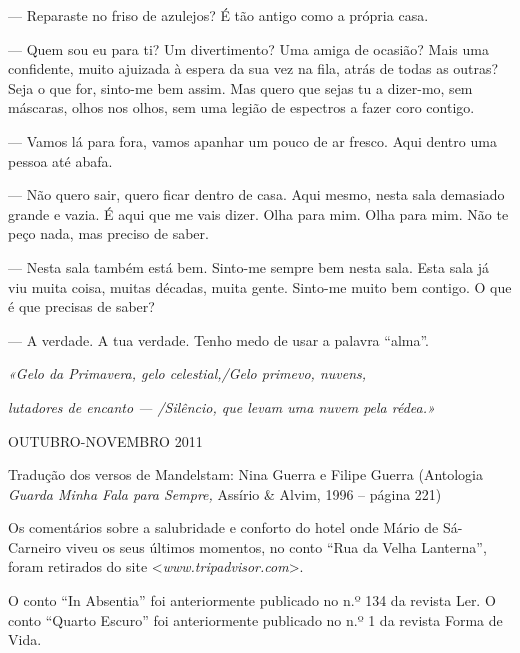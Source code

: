 --- Reparaste no friso de azulejos? É tão antigo como a própria casa.

--- Quem sou eu para ti? Um divertimento? Uma amiga de ocasião? Mais uma
  confidente, muito ajuizada à espera da sua vez na fila, atrás de todas
  as outras? Seja o que for, sinto-me bem assim. Mas quero que sejas tu
  a dizer-mo, sem máscaras, olhos nos olhos, sem uma legião de espectros
  a fazer coro contigo.

--- Vamos lá para fora, vamos apanhar um pouco de ar
fresco. Aqui dentro uma pessoa até abafa.

--- Não quero sair, quero ficar dentro de casa. Aqui mesmo, nesta sala
  demasiado grande e vazia. É aqui que me vais dizer. Olha para mim.
  Olha para mim. Não te peço nada, mas preciso de saber.

--- Nesta sala também está bem. Sinto-me sempre bem nesta sala. Esta sala
  já viu muita coisa, muitas décadas, muita gente. Sinto-me muito bem
  contigo. O que é que precisas de saber?

--- A verdade. A tua verdade. Tenho medo de usar a palavra ``alma''.

\emph{«Gelo da Primavera, gelo celestial,/Gelo primevo, nuvens,}

\emph{lutadores de encanto --- /Silêncio, que levam uma nuvem pela
rédea.»}

OUTUBRO-NOVEMBRO 2011

Tradução dos versos de Mandelstam: Nina Guerra e Filipe Guerra
(Antologia \emph{Guarda Minha Fala para Sempre, }Assírio \& Alvim, 1996
-- página 221)

Os comentários sobre a salubridade e conforto do hotel onde Mário de
Sá-Carneiro viveu os seus últimos momentos, no conto ``Rua da Velha
Lanterna'', foram retirados do site \textless{}\emph{www.tripadvisor.com}\textgreater{}.

O conto ``In Absentia'' foi anteriormente publicado no n.º 134 da
revista Ler. O conto ``Quarto Escuro'' foi anteriormente publicado no
n.º 1 da revista Forma de Vida.

